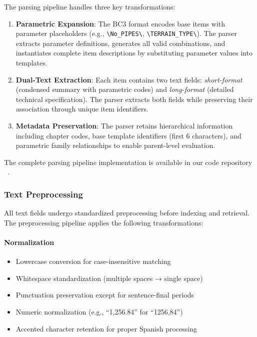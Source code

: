 \documentclass[preprint,12pt]{elsarticle}
\begin{document}
The parsing pipeline handles three key transformations:

\begin{enumerate}
    \item \textbf{Parametric Expansion}: The BC3 format encodes base items with parameter placeholders (e.g., \texttt{\textbackslash No\_PIPES\textbackslash}, \texttt{\textbackslash TERRAIN\_TYPE\textbackslash}). The parser extracts parameter definitions, generates all valid combinations, and instantiates complete item descriptions by substituting parameter values into templates.
    
    \item \textbf{Dual-Text Extraction}: Each item contains two text fields: \textit{short-format} (condensed summary with parametric codes) and \textit{long-format} (detailed technical specification). The parser extracts both fields while preserving their association through unique item identifiers.
    
    \item \textbf{Metadata Preservation}: The parser retains hierarchical information including chapter codes, base template identifiers (first 6 characters), and parametric family relationships to enable parent-level evaluation.
\end{enumerate}

The complete parsing pipeline implementation is available in our code repository ~\cite{bc3cat_software}.

\subsubsection{Text Preprocessing}

All text fields undergo standardized preprocessing before indexing and retrieval. The preprocessing pipeline applies the following transformations:

\paragraph{Normalization}
\begin{itemize}
    \item Lowercase conversion for case-insensitive matching
    \item Whitespace standardization (multiple spaces → single space)
    \item Punctuation preservation except for sentence-final periods
    \item Numeric normalization (e.g., ``1,256.84'' for ``1256,84'')
    \item Accented character retention for proper Spanish processing
\end{itemize}
\end{document}
